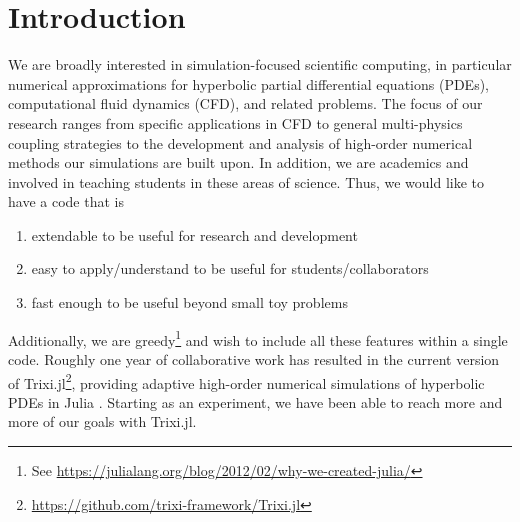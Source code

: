 \documentclass{juliacon}
\newcommand{\trixi}{Trixi.jl\xspace}
\begin{document}


\maketitle

\begin{abstract}
We present Trixi.jl, a Julia library for adaptive high-order numerical simulations
of hyperbolic partial differential equations (PDEs). Utilizing Julia's strengths,
Trixi.jl is extendable, easy to use, and fast. We describe the main design choices
that enable these features and compare Trixi.jl with an established open
source Fortran code for hyperbolic PDEs using the same numerical methods.
We conclude with an assessment of Julia for simulation-focused scientific
computing, an area that is still dominated by traditional high-performance
computing languages such as C, C++, and Fortran.
\end{abstract}


\section{Introduction}

We are broadly interested in simulation-focused scientific computing, in particular
numerical approximations for hyperbolic partial differential equations (PDEs), computational fluid dynamics (CFD),
and related problems. The focus of our research ranges from specific applications
in CFD to general multi-physics coupling strategies to the development and analysis of high-order numerical methods
our simulations are built upon. In addition, we are academics and involved in teaching
students in these areas of science. Thus, we would like to have a
code that is
\begin{enumerate}
  \item extendable to be useful for research and development
  \item easy to apply/understand to be useful for students/collaborators
  \item fast enough to be useful beyond small toy problems
\end{enumerate}
Additionally, we are greedy\footnote{See \url{https://julialang.org/blog/2012/02/why-we-created-julia/}}
and wish to include all these features within a single code.
Roughly one year of collaborative work has resulted in the current version of
\trixi\footnote{\url{https://github.com/trixi-framework/Trixi.jl}}, providing adaptive
high-order numerical simulations of hyperbolic PDEs
in Julia \cite{bezanson2017julia}. Starting as an experiment, we have been able
to reach more and more of our goals with \trixi.
\end{document}
